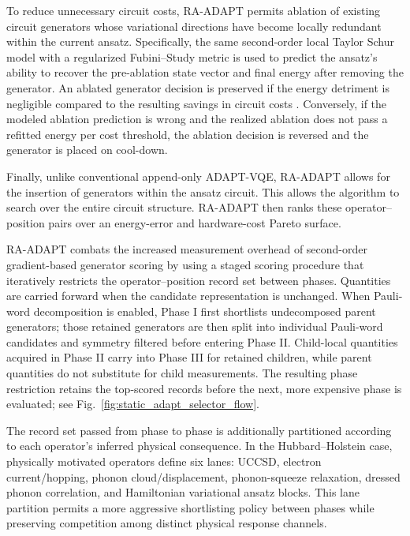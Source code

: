 \documentclass[
  reprint,
  amsmath,
  amssymb,
  aps,
  pra,
  nofootinbib,
  superscriptaddress,
  floatfix
]{revtex4-2}
\begin{document}
To reduce unnecessary circuit costs, \textsc{RA-ADAPT} permits ablation of existing circuit generators whose variational directions have become locally redundant within the current ansatz. Specifically, the same second-order local Taylor Schur model with a regularized Fubini--Study metric is used to predict the ansatz's ability to recover the pre-ablation state vector and final energy after removing the generator. An ablated generator decision is preserved if the energy detriment is negligible compared to the resulting savings in circuit costs \cite{Vaquero2025PrunedADAPT}. Conversely, if the modeled ablation prediction is wrong and the realized ablation does not pass a refitted energy per cost threshold, the ablation decision is reversed and the generator is placed on cool-down.

Finally, unlike conventional append-only ADAPT-VQE, \textsc{RA-ADAPT} allows for the insertion of generators within the ansatz circuit. This allows the algorithm to search over the entire circuit structure. \textsc{RA-ADAPT} then ranks these operator--position pairs over an energy-error and hardware-cost Pareto surface.

\textsc{RA-ADAPT} combats the increased measurement overhead of second-order gradient-based generator scoring by using a staged scoring procedure that iteratively restricts the operator--position record set between phases. Quantities are carried forward when the candidate representation is unchanged. When Pauli-word decomposition is enabled, Phase I first shortlists undecomposed parent generators; those retained generators are then split into individual Pauli-word candidates and symmetry filtered before entering Phase II. Child-local quantities acquired in Phase II carry into Phase III for retained children, while parent quantities do not substitute for child measurements. The resulting phase restriction retains the top-scored records before the next, more expensive phase is evaluated; see Fig.~\ref{fig:static_adapt_selector_flow}.

The record set passed from phase to phase is additionally partitioned according to each operator's inferred physical consequence. In the Hubbard--Holstein case, physically motivated operators define six lanes: UCCSD, electron current/hopping, phonon cloud/displacement, phonon-squeeze relaxation, dressed phonon correlation, and Hamiltonian variational ansatz blocks. This lane partition permits a more aggressive shortlisting policy between phases while preserving competition among distinct physical response channels.
\end{document}
